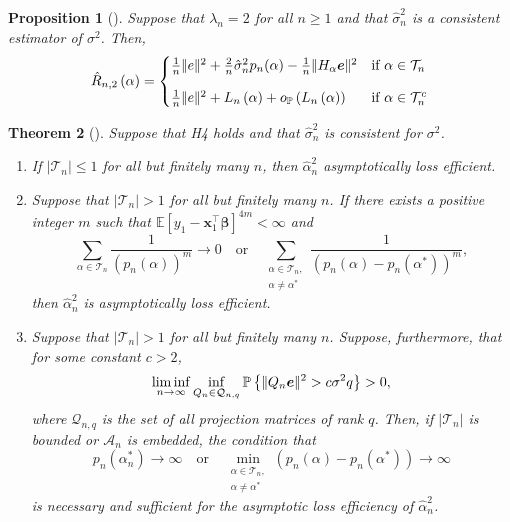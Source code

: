 \documentclass[12pt, letter paper]{article}
\newcommand{\1}{\mathmybb{1}}
\newtheorem{proposition}{Proposition}[section]
\newtheorem{theorem}[proposition]{Theorem}
\newcommand{\0}{\emptyset}
\newcommand{\prob}{\mathbb{P}}
\newcommand{\Ep}[1]{\mathbb{E}\left[ #1 \right]}
\newcommand{\paren}[1]{\left(#1 \right)}
\newcommand{\set}[1]{\left\{ #1 \right\}}
\newcommand{\norm}[1]{|\hspace{-1pt}|#1 |\hspace{-1pt}|}
\newcommand{\normsq}[1]{\norm{#1}^{2}}
\newcommand{\Acal}{\mathcal{A}_{n}}
\newcommand{\Tcal}{\mathcal{T}_{n}}
\newcommand{\x}{\boldsymbol{x}}
\newcommand{\e}{\boldsymbol{e}}
\newcommand{\bbeta}{\boldsymbol{\beta}}
\newcommand{\Loss}[1]{L_{n}\paren{#1}}
\newcommand{\Rhat}[2]{\hat{R}_{n, #1}\paren{#2}}
\newcommand{\alphahat}[1]{\hat{\alpha}^{#1}}
\newcommand{\op}[1]{o_{\prob}\paren{#1}}
\newcommand{\sigmahat}{\hat{\sigma}^{2}_{n}}
\begin{document}
\begin{proposition}[\cite{shao_1997}]\label{prop:97prop1}
    Suppose that \(\lambda_{n}=2\) for all \(n\geq 1\) and that \(\sigmahat\) is a consistent estimator of \(\sigma^{2}\). Then,
    \[\Rhat{2}{\alpha} = \begin{cases}
        \frac{1}{n}\normsq{e} + \frac{2}{n}\sigmahat p_{n}(\alpha) - \frac{1}{n}\normsq{H_{\alpha}\e} &\text{if }\alpha\in\Tcal\\[3mm]
        \frac{1}{n}\normsq{e} + \Loss{\alpha} + \op{\Loss{\alpha}} &\text{if }\alpha\in\Tcal^{c}
    \end{cases}\]
\end{proposition}

\begin{theorem}[\cite{shao_1997}]\label{thm:97thm1}
    Suppose that H4 holds and that \(\sigmahat\) is consistent for \(\sigma^{2}\).
    \begin{enumerate}
        \item If \(|\Tcal|\leq1\) for all but finitely many \(n\), then \(\alphahat{2}_{n}\) asymptotically loss efficient.
        \item Suppose that \(|\Tcal|> 1\) for all but finitely many \(n\). If there exists a positive integer \(m\) such that \(\Ep{y_{1} - \x_{1}^{\top}\bbeta}^{4m}<\infty\) and 
        \begin{equation}
            \sum_{\alpha\in\Tcal}\frac{1}{\paren{p_{n}(\alpha)}^{m}}\to 0 \quad\text{or}\quad \sum_{\substack{\alpha\in\Tcal,\\ \alpha\neq\alpha^{*}}}\frac{1}{\paren{p_{n}(\alpha) - p_{n}(\alpha^{*})}^{m}},
        \end{equation}
        then \(\alphahat{2}_{n}\) is asymptotically loss efficient.
        \item Suppose that \(|\Tcal|>1\) for all but finitely many \(n\). Suppose, furthermore, that for some constant \(c>2\), 
        \begin{equation}
            \label{eq:conditionQ}
            \liminf_{n\to\infty}\inf_{Q_{n}\in\mathcal{Q}_{n,q}}\prob\set{\normsq{Q_{n}\e} > c\sigma^{2}q} > 0,
        \end{equation}
        where \(\mathcal{Q}_{n,q}\) is the set of all projection matrices of rank \(q\). Then, if \(|\Tcal|\) is bounded or \(\Acal\) is embedded, the condition that
        \begin{equation}
            \label{eq:conditionP}
            p_{n}(\alpha^{*}_{n})\to\infty\quad\text{or}\quad \min_{\substack{\alpha\in\Tcal,\\ \alpha\neq\alpha^{*}}}\paren{p_{n}(\alpha) - p_{n}(\alpha^{*})}\to\infty
        \end{equation}
        is necessary and sufficient for the asymptotic loss efficiency of \(\alphahat{2}_{n}\).
    \end{enumerate}
\end{theorem}
\end{document}

